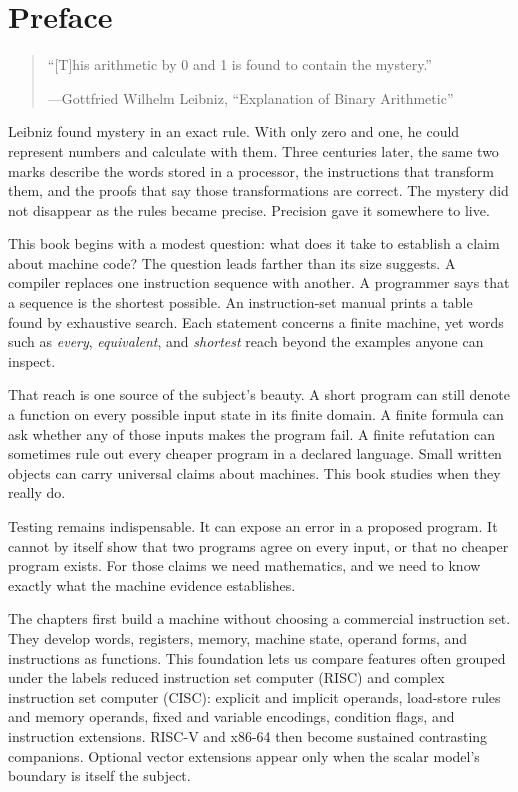 \chapter{Preface}

\begin{quotation}
``[T]his arithmetic by 0 and 1 is found to contain the mystery.''

---Gottfried Wilhelm Leibniz, ``Explanation of Binary Arithmetic''
\autocite{leibniz1703binary}
\end{quotation}

Leibniz found mystery in an exact rule. With only zero and one, he could
represent numbers and calculate with them. Three centuries later, the same
two marks describe the words stored in a processor, the instructions that
transform them, and the proofs that say those transformations are correct.
The mystery did not disappear as the rules became precise. Precision gave it
somewhere to live.

This book begins with a modest question: what does it take to establish a
claim about machine code? The question leads farther than its size suggests.
A compiler replaces one instruction sequence with another. A programmer says
that a sequence is the shortest possible. An instruction-set manual prints a
table found by exhaustive search. Each statement concerns a finite machine,
yet words such as \emph{every}, \emph{equivalent}, and \emph{shortest} reach
beyond the examples anyone can inspect.

That reach is one source of the subject's beauty. A short program can still
denote a function on every possible input state in its finite domain. A finite
formula can ask whether any of those inputs makes the program fail. A finite
refutation can sometimes rule out every cheaper program in a declared
language. Small written objects can carry universal claims about machines.
This book studies when they really do.

Testing remains indispensable. It can expose an error in a proposed program.
It cannot by itself show that two programs agree on every input, or that no
cheaper program exists. For those claims we need mathematics, and we need to
know exactly what the machine evidence establishes.

The chapters first build a machine without choosing a commercial instruction
set. They develop words, registers, memory, machine state, operand forms, and
instructions as functions. This foundation lets us compare features often
grouped under the labels reduced instruction set computer (RISC) and complex
instruction set computer (CISC): explicit and implicit operands,
load-store rules and memory operands, fixed and variable encodings, condition
flags, and instruction extensions. RISC-V and x86-64 then become sustained
contrasting companions. Optional vector extensions appear only when the scalar
model's boundary is itself the subject.

